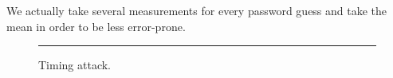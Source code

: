 We actually take several measurements for every password guess and take the mean in order to be less error-prone.


\begin{figure}[h!]
    \begin{center}
        
        \caption{Timing attack.}
        \label{fig:as5-schematic}
        \vspace{1em}\hrule
    \end{center}
\end{figure}
